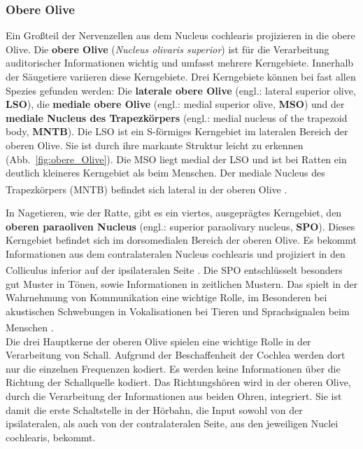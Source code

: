 \documentclass[12pt,a4paper,pdftex]{article}
\begin{document}
\subsubsection*{Obere Olive}
Ein Großteil der Nervenzellen aus dem Nucleus cochlearis projizieren in die obere Olive. Die \textbf{obere Olive} (\textit{Nucleus olivaris superior}) ist für die Verarbeitung auditorischer Informationen wichtig und umfasst mehrere Kerngebiete. Innerhalb der Säugetiere variieren diese Kerngebiete. Drei Kerngebiete können bei fast allen Spezies gefunden werden: Die \textbf{laterale obere Olive} (engl.: lateral superior olive, \textbf{LSO}), die \textbf{mediale obere Olive} (engl.: medial superior olive, \textbf{MSO}) und der \textbf{mediale Nucleus des Trapezkörpers} (engl.: medial nucleus of the trapezoid body, \textbf{MNTB}). Die LSO ist ein S-förmiges Kerngebiet im lateralen Bereich der oberen Olive. Sie ist durch ihre markante Struktur leicht zu erkennen (Abb.~\ref{fig:obere_Olive}). Die MSO liegt medial der LSO und ist bei Ratten ein deutlich kleineres Kerngebiet als beim Menschen. Der mediale Nucleus des Trapezkörpers (MNTB) befindet sich lateral in der oberen Olive \textsuperscript{\cite[29]{paxinos2014rat}}.

In Nagetieren, wie der Ratte, gibt es ein viertes, ausgeprägtes Kerngebiet, den \textbf{oberen paraoliven Nucleus} (engl.: superior paraolivary nucleus, \textbf{SPO}). Dieses Kerngebiet befindet sich im dorsomedialen Bereich der oberen Olive. Es bekommt Informationen aus dem contralateralen Nucleus cochlearis und projiziert in den Colliculus inferior auf der ipsilateralen Seite \textsuperscript{\cite[29]{paxinos2014rat}}. Die SPO entschlüsselt besonders gut Muster in Tönen, sowie Informationen in zeitlichen Mustern. Das spielt in der Wahrnehmung von Kommunikation eine wichtige Rolle, im Besonderen bei akustischen Schwebungen in Vokalisationen bei Tieren und Sprachsignalen beim Menschen \textsuperscript{\cite[29]{paxinos2014rat}}. 
\\

\noindent Die drei Hauptkerne der oberen Olive spielen eine wichtige Rolle in der Verarbeitung von Schall. Aufgrund der Beschaffenheit der Cochlea werden dort nur die einzelnen Frequenzen kodiert. Es werden keine Informationen über die Richtung der Schallquelle kodiert. Das Richtungshören wird in der oberen Olive, durch die Verarbeitung der Informationen aus beiden Ohren, integriert. Sie ist damit die erste Schaltstelle in der Hörbahn, die Input sowohl von der ipsilateralen, als auch von der contralateralen Seite, aus den jeweiligen Nuclei cochlearis, bekommt.
\\
\end{document}
